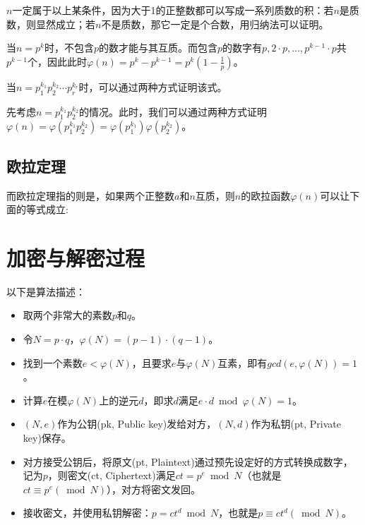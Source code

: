 \documentclass[a4paper]{article}  %
\begin{document}
$n$一定属于以上某条件，因为大于1的正整数都可以写成一系列质数的积：若$n$是质数，则显然成立；若$n$不是质数，那它一定是个合数，用归纳法可以证明。

当$n = p^k$时，不包含$p$的数才能与其互质。而包含$p$的数字有$p,2\cdot p,\ldots ,p^{k-1}\cdot p$共$p^{k-1}$个，因此此时$\varphi(n) = p^k - p^{k-1} = p^k (1 - \frac{1}{p} )$。

当$n = p_{1}^{k_1}p_{2}^{k_2}\cdots p_{r}^{k_r}$时，可以通过两种方式证明该式。

\begin{minipage}[t]{\linewidth}

\qquad 先考虑$n = p_{1}^{k_1}p_{2}^{k_2}$的情况。此时，我们可以通过两种方式证明$\varphi(n)=\varphi(p_{1}^{k_1}p_{2}^{k_2})=\varphi(p_{1}^{k_1})\varphi(p_{2}^{k_2})$。
	\end{minipage}


\subsection[欧拉定理]{欧拉定理}

而欧拉定理指的则是，如果两个正整数$a$和$n$互质，则$n$的欧拉函数$\varphi(n)$可以让下面的等式成立:

\section[算法描述]{加密与解密过程}

以下是算法描述：
\begin{itemize}
	\item 取两个非常大的素数$p$和$q$。
	\item 令$N = p \cdot q$，$\varphi(N) = (p - 1) \cdot (q - 1)$。
	\item 找到一个素数$e < \varphi(N)$，且要求$e$与$\varphi(N)$互素，即有$gcd(e, \varphi(N)) = 1$。 %
	\item 计算$e$在模$\varphi(N)$上的逆元$d$，即求$d$满足$e \cdot d \bmod \varphi(N) = 1$。
	\item $(N, e)$作为公钥(pk, Public key)发给对方，$(N, d)$作为私钥(pt, Private key)保存。
	\item 对方接受公钥后，将原文(pt, Plaintext)通过预先设定好的方式转换成数字，记为$p$，则密文(ct, Ciphertext)满足$ct = p ^ e \bmod N$（也就是$ct \equiv p ^ e (\bmod N)$），对方将密文发回。
	\item 接收密文，并使用私钥解密：$p = ct ^ d \bmod N$，也就是$p \equiv ct ^ d (\bmod N)$。
\end{itemize}

\end{document}
